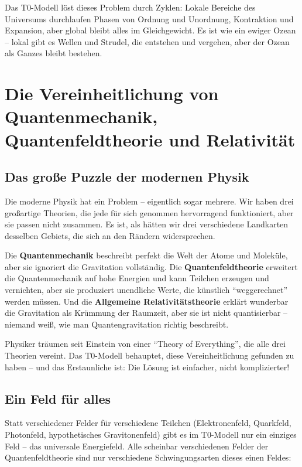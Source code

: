 	Das T0-Modell löst dieses Problem durch Zyklen: Lokale Bereiche des Universums durchlaufen Phasen von Ordnung und Unordnung, Kontraktion und Expansion, aber global bleibt alles im Gleichgewicht. Es ist wie ein ewiger Ozean -- lokal gibt es Wellen und Strudel, die entstehen und vergehen, aber der Ozean als Ganzes bleibt bestehen.
	
	\section{Die Vereinheitlichung von Quantenmechanik, Quantenfeldtheorie und Relativität}
	
	\subsection{Das große Puzzle der modernen Physik}
	
	Die moderne Physik hat ein Problem -- eigentlich sogar mehrere. Wir haben drei großartige Theorien, die jede für sich genommen hervorragend funktioniert, aber sie passen nicht zusammen. Es ist, als hätten wir drei verschiedene Landkarten desselben Gebiets, die sich an den Rändern widersprechen.
	
	Die \textbf{Quantenmechanik} beschreibt perfekt die Welt der Atome und Moleküle, aber sie ignoriert die Gravitation vollständig. Die \textbf{Quantenfeldtheorie} erweitert die Quantenmechanik auf hohe Energien und kann Teilchen erzeugen und vernichten, aber sie produziert unendliche Werte, die künstlich ``weggerechnet'' werden müssen. Und die \textbf{Allgemeine Relativitätstheorie} erklärt wunderbar die Gravitation als Krümmung der Raumzeit, aber sie ist nicht quantisierbar -- niemand weiß, wie man Quantengravitation richtig beschreibt.
	
	Physiker träumen seit Einstein von einer ``Theory of Everything'', die alle drei Theorien vereint. Das T0-Modell behauptet, diese Vereinheitlichung gefunden zu haben -- und das Erstaunliche ist: Die Lösung ist einfacher, nicht komplizierter!
	
	\subsection{Ein Feld für alles}
	
	Statt verschiedener Felder für verschiedene Teilchen (Elektronenfeld, Quarkfeld, Photonfeld, hypothetisches Gravitonenfeld) gibt es im T0-Modell nur ein einziges Feld -- das universale Energiefeld. Alle scheinbar verschiedenen Felder der Quantenfeldtheorie sind nur verschiedene Schwingungsarten dieses einen Feldes:
	
